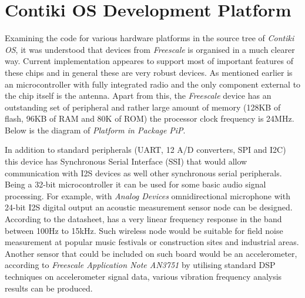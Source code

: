 \section{Contiki OS Development Platform}

  Examining the code for various hardware platforms in the source
 tree of \emph{Contiki OS}, it was understood that 
 devices from \emph{Freescale} is organised in a much clearer way.
 Current implementation appeares to support most of important
 features of these chips and in general these are very robust
 devices. As mentioned earlier  is an 
 microcontroller with fully integrated radio and the only component
 external to the chip itself is the antenna. Apart from this, the
 \emph{Freescale} device has an outstanding set of peripheral and
 rather large amount of memory (128KB of flash, 96KB of RAM and
 80K of ROM) the processor clock frequency is 24MHz.
 Below is the diagram of  \emph{Platform in Package}
 \emph{PiP}.

  In addition to standard peripherals (UART, 12 A/D converters,
 SPI and I2C) this device has Synchronous Serial Interface (SSI)
 that would allow communication with I2S devices as well other
 synchronous serial peripherals. Being a 32-bit microcontroller
 it can be used for some basic audio signal processing. For example,
 with \emph{Analog Devices}  omnidirectional microphone
 with 24-bit I2S digital output \cite{datasheet:adi:ADMP441} an
 acoustic measurement sensor node can be designed. According to the
 datasheet,  has a very linear frequency response in
 the band between 100Hz to 15kHz. Such wireless node would be
 suitable for field noise measurement at popular music festivals
 or construction sites and industrial areas.
 Another sensor that could be included on such board would be an
 accelerometer, according to \emph{Freescale Application
 Note AN3751} \cite{appnote:freescale:AN3751} by utilising standard
 DSP techniques on accelerometer signal data, various vibration
 frequency analysis results can be produced.


 

